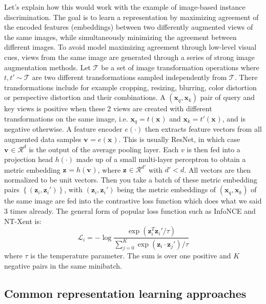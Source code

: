Let's explain how this would work with the example of image-based instance discrimination.
The goal is to learn a representation by maximizing agreement of the encoded features (embeddings)
between two differently augmented views of the same images,
while simultaneously minimizing the agreement between different images.
To avoid model maximizing agreement through low-level visual cues, views
from the same image are generated through a series of strong image augmentation methods.
Let $ \mathcal{T}  $ be a set of image transformation operations where
$ t, t' \sim \mathcal{T}  $ are two different transformations sampled independently from $ \mathcal{T}  $.
There transformations include for example cropping, resizing, blurring, 
color distortion or perspective distortion and their combinations.
A $ (\bm{x}_{q}, \bm{x}_{k})  $ pair of query and key views is positive when these 2 views
are created with different transformations on the same image,
i.e. $ \bm{x}_{q} = t (\bm{x}_{})  $ and $ \bm{x}_{k} = t' (\bm{x}_{})  $,
and is negative otherwise.
A feature encoder $ e (\cdot)  $ then extracts feature vectors from all augmented data samples 
$ \bm{v}_{} = e (\bm{x}_{})  $. This is usually ResNet, in which case 
$ \bm{v}_{} \in \mathcal{R}^{ d }  $ is the output of the average pooling layer.
Each $ v  $ is then fed into a projection head $ h (\cdot)  $ made up of
a small multi-layer perceptron to obtain a metric embedding $ \bm{z}_{} = h (\bm{v}_{})  $,
where $ \bm{z}_{} \in \mathcal{R}^{ d' }  $ with $ d' < d  $.
All vectors are then normalized to be unit vectors.
Then you take a batch of these metric embedding pairs $ \left\{ (\bm{z}_{i}, \bm{z}_{i}') \right\}   $,
with $ (\bm{z}_{i}, \bm{z}_{i}')  $ being the metric embeddings of
$ (\bm{x}_{q}, \bm{x}_{k})  $ of the same image
are fed into the contrastive loss function which does what we said 3 times already.
The general form of popular loss function such as InfoNCE and NT-Xent
is:
\begin{equation}
		\mathcal{L}_{ i } = - \log \frac{\exp (\bm{z}_{i}^{ T }\bm{z}_{i}'/\tau)}{\sum_{j=0}^{K} \exp (\bm{z}_{i} \cdot \bm{z}_{j}')/\tau} 
\end{equation}
where $ \tau  $ is the temperature parameter.
The sum is over one positive and $ K  $ negative pairs in the same minibatch.


\subsection{Common representation learning approaches}
